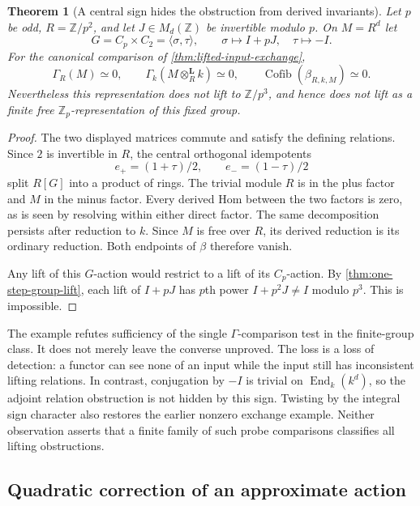 \documentclass[11pt]{article}
\newtheorem{theorem}{Theorem}[section]
\theoremstyle{definition}
\theoremstyle{remark}
\newcommand{\Cofib}{\operatorname{Cofib}}
\begin{document}
\begin{theorem}[A central sign hides the obstruction from derived invariants]\label{thm:blind-exchange}
Let $p$ be odd, $R=\mathbb Z/p^2$, and let $J\in M_d(\mathbb Z)$ be invertible modulo $p$. On $M=R^d$ let
\[
 G=C_p\times C_2=\langle\sigma,\tau\rangle,
 \qquad \sigma\mapsto I+pJ,\quad \tau\mapsto-I.
\]
For the canonical comparison of \cref{thm:lifted-input-exchange},
\[
 \Gamma_R(M)\simeq0,
 \qquad \Gamma_k(M\otimes_R^{\mathbf L}k)\simeq0,
 \qquad \Cofib(\beta_{R,k,M})\simeq0.
\]
Nevertheless this representation does not lift to $\mathbb Z/p^3$, and hence does not lift as a finite free $\mathbb Z_p$-representation of this fixed group.
\end{theorem}
\begin{proof}
The two displayed matrices commute and satisfy the defining relations. Since $2$ is invertible in $R$, the central orthogonal idempotents
\[
 e_+=(1+\tau)/2,\qquad e_-=(1-\tau)/2
\]
split $R[G]$ into a product of rings. The trivial module $R$ is in the plus factor and $M$ in the minus factor. Every derived Hom between the two factors is zero, as is seen by resolving within either direct factor. The same decomposition persists after reduction to $k$. Since $M$ is free over $R$, its derived reduction is its ordinary reduction. Both endpoints of $\beta$ therefore vanish.

Any lift of this $G$-action would restrict to a lift of its $C_p$-action. By \cref{thm:one-step-group-lift}, each lift of $I+pJ$ has $p$th power $I+p^2J\ne I$ modulo $p^3$. This is impossible.
\end{proof}

The example refutes sufficiency of the single $\Gamma$-comparison test in the finite-group class. It does not merely leave the converse unproved. The loss is a loss of detection: a functor can see none of an input while the input still has inconsistent lifting relations. In contrast, conjugation by $-I$ is trivial on $\operatorname{End}_k(k^d)$, so the adjoint relation obstruction is not hidden by this sign. Twisting by the integral sign character also restores the earlier nonzero exchange example. Neither observation asserts that a finite family of such probe comparisons classifies all lifting obstructions.

\subsection{Quadratic correction of an approximate action}
\end{document}
